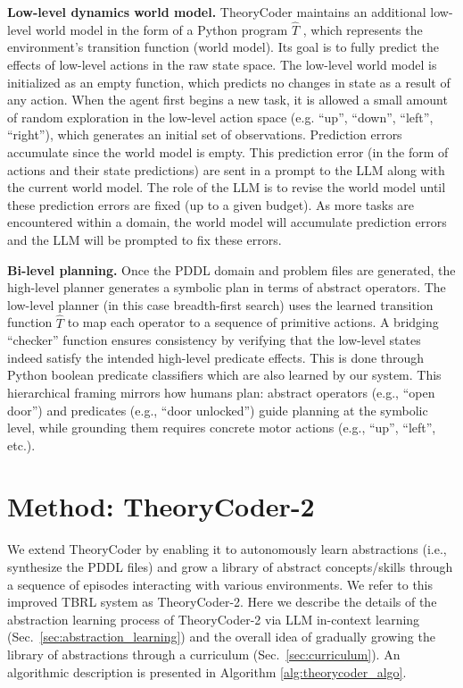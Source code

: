 \documentclass{article}
\theoremstyle{plain}
\theoremstyle{definition}
\theoremstyle{remark}
\begin{document}
\textbf{Low-level dynamics world model.} TheoryCoder maintains an additional low-level world model in the form of a Python program $\hat{T}$ , which represents the environment’s transition function (world model). Its goal is to fully predict the effects of low-level actions in the raw state space. The low-level world model is initialized as an empty function, which predicts no changes in state as a result of any action.  When the agent first begins a new task, it is allowed a small amount of random exploration in the low-level action space (e.g. ``up'', ``down'', ``left'', ``right''), which generates an initial set of observations.  Prediction errors accumulate since the world model is empty. This prediction error (in the form of actions and their state predictions) are sent in a prompt to the LLM along with the current world model. The role of the LLM is to revise the world model until these prediction errors are fixed (up to a given budget). As more tasks are encountered within a domain, the world model will accumulate prediction errors and the LLM will be prompted to fix these errors. 

\textbf{Bi-level planning.} Once the PDDL domain and problem files are generated, the high-level planner \citep[Fast Downward;][]{helmert2006fast} generates a symbolic plan in terms of abstract operators. The low-level planner (in this case breadth-first search) uses the learned transition function $\hat{T}$ to map each operator to a sequence of primitive actions. A bridging ``checker'' function ensures consistency by verifying that the low-level states indeed satisfy the intended high-level predicate effects. This is done through Python boolean predicate classifiers which are also learned by our system.
This hierarchical framing mirrors how humans plan: abstract operators (e.g., ``open door'') and predicates (e.g., ``door unlocked'') guide planning at the symbolic level, while grounding them requires concrete motor actions (e.g., ``up'', ``left'', etc.).

\section{Method: TheoryCoder-2}
\label{sec:method}

We extend TheoryCoder by enabling it to autonomously learn abstractions (i.e., synthesize the PDDL files) and grow a library of abstract concepts/skills through a sequence of episodes interacting with various environments. We refer to this improved TBRL system as TheoryCoder-2.
Here we describe the details of the abstraction learning process of TheoryCoder-2 via LLM in-context learning (Sec.~\ref{sec:abstraction_learning}) and the overall idea of gradually growing the library of abstractions through a curriculum (Sec.~\ref{sec:curriculum}). An algorithmic description is presented in Algorithm \ref{alg:theorycoder_algo}. 
\end{document}
